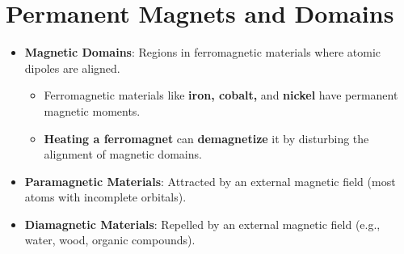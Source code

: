\documentclass{article}
\begin{document}
\section*{Permanent Magnets and Domains}
\begin{itemize}
    \item \textbf{Magnetic Domains}: Regions in ferromagnetic materials where atomic dipoles are aligned.
    \begin{itemize}
        \item Ferromagnetic materials like \textbf{iron, cobalt,} and \textbf{nickel} have permanent magnetic moments.
        \item \textbf{Heating a ferromagnet} can \textbf{demagnetize} it by disturbing the alignment of magnetic domains.
    \end{itemize}
    \item \textbf{Paramagnetic Materials}: Attracted by an external magnetic field (most atoms with incomplete orbitals).
    \item \textbf{Diamagnetic Materials}: Repelled by an external magnetic field (e.g., water, wood, organic compounds).
\end{itemize}
\end{document}
